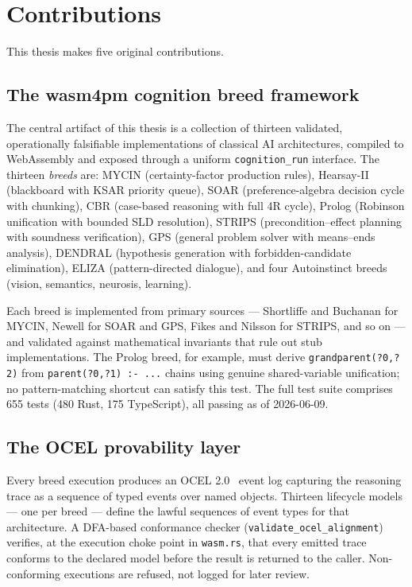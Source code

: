 \section{Contributions}
\label{sec:contributions}

This thesis makes five original contributions.

\subsection{The wasm4pm cognition breed framework}

The central artifact of this thesis is a collection of thirteen validated, operationally
falsifiable implementations of classical AI architectures, compiled to WebAssembly and
exposed through a uniform \texttt{cognition\_run} interface.
The thirteen \emph{breeds} are: MYCIN (certainty-factor production rules), Hearsay-II
(blackboard with KSAR priority queue), SOAR (preference-algebra decision cycle with
chunking), CBR (case-based reasoning with full 4R cycle), Prolog (Robinson unification
with bounded SLD resolution), STRIPS (precondition--effect planning with soundness
verification), GPS (general problem solver with means--ends analysis), DENDRAL
(hypothesis generation with forbidden-candidate elimination), ELIZA (pattern-directed
dialogue), and four Autoinstinct breeds (vision, semantics, neurosis, learning).

Each breed is implemented from primary sources --- Shortliffe and Buchanan for MYCIN,
Newell for SOAR and GPS, Fikes and Nilsson for STRIPS, and so on --- and validated
against mathematical invariants that rule out stub implementations.
The Prolog breed, for example, must derive \texttt{grandparent(?0,?2)} from
\texttt{parent(?0,?1) :- ...} chains using genuine shared-variable unification; no
pattern-matching shortcut can satisfy this test.
The full test suite comprises 655 tests (480 Rust, 175 TypeScript), all passing as of
2026-06-09.

\subsection{The OCEL provability layer}

Every breed execution produces an OCEL 2.0~\cite{ghahfarokhi2021ocel} event log
capturing the reasoning trace as a sequence of typed events over named objects.
Thirteen lifecycle models --- one per breed --- define the lawful sequences of event types
for that architecture.
A DFA-based conformance checker (\texttt{validate\_ocel\_alignment}) verifies, at the
execution choke point in \texttt{wasm.rs}, that every emitted trace conforms to the
declared model before the result is returned to the caller.
Non-conforming executions are refused, not logged for later review.

